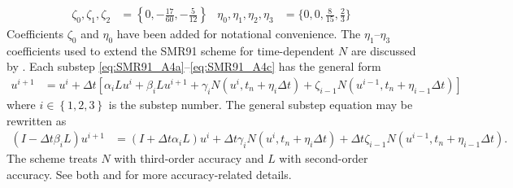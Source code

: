 \documentclass[letterpaper,11pt,nointlimits,reqno,draft]{amsbook}
\begin{document}
\begin{align*}
  \zeta_0, \zeta_1, \zeta_2 &= \left\{
    0, -\frac{17}{60}, -\frac{5}{12}
  \right\}
  &
  \eta_0, \eta_1, \eta_2, \eta_3 &= \Biggl\{
    0, 0, \frac{8}{15}, \frac{2}{3}
  \Biggr\}
\end{align*}
Coefficients $\zeta_0$ and $\eta_0$ have been added for notational convenience.
The $\eta_{1}$--$\eta_{3}$ coefficients used to extend the SMR91 scheme for
time-dependent $N$ are discussed by \citet{ShanYang2011}.  Each substep
\eqref{eq:SMR91_A4a}--\eqref{eq:SMR91_A4c} has the general form
\begin{align}
  u^{i+1} &= u^i + \Delta{}t \left[
        \alpha_{i} L u^i
      + \beta_{i}  L u^{i+1}
      + \gamma_{i} N\left( u^{i}, t_{n}+\eta_{i}\Delta{}t \right)
      + \zeta_{i-1} N\left( u^{i-1}, t_{n}+\eta_{i-1}\Delta{}t \right)
  \right]
  \label{eq:generalsubstep}
\end{align}
where $i\in\left\{ 1,2,3 \right\}$ is the substep number.
The general substep equation may be rewritten as
\begin{align}
  \left(I - \Delta{}t\beta_{i}L\right) u^{i+1}
  &=
  \left(I + \Delta{}t\alpha_{i}L\right) u^{i}
  + \Delta{}t\gamma_{i}N\left(u^{i}, t_{n}+\eta_{i}\Delta{}t\right)
  + \Delta{}t\zeta_{i-1}N\left(u^{i-1}, t_{n}+\eta_{i-1}\Delta{}t\right)
  \label{eq:generaloperatorsubstep}
  .
\end{align}
The scheme treats $N$ with third-order accuracy and $L$ with second-order
accuracy.  See both \citet[page 323]{spalart_lowstoragerk} and
\citet[chapter 6]{ShanYang2011} for more accuracy-related details.
\end{document}
